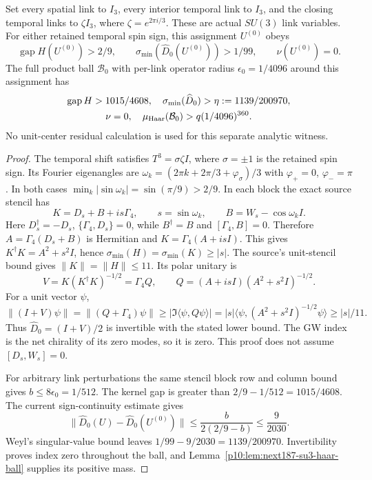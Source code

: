 \documentclass[12pt,a4paper]{article}
\begin{document}
\begin{theorem}
\label{p10:thm:v2189-zero-index-overlap-witness}
Set every spatial link to $I_3$, every interior temporal link to $I_3$,
and the closing temporal links to $\zeta I_3$, where
$\zeta=e^{2\pi i/3}$. These are actual $SU(3)$ link variables.
For either retained temporal spin sign, this assignment $U^{(0)}$ obeys
\[
 \operatorname{gap}H(U^{(0)})>2/9,
 \qquad \sigma_{\min}(\widehat D_0(U^{(0)}))>1/99,
 \qquad \nu(U^{(0)})=0.
\]
The full product ball $\mathcal B_0$ with per-link operator radius
$\epsilon_0=1/4096$ around this assignment has
\[
 \begin{gathered}
 \operatorname{gap}H>1015/4608,\quad
 \sigma_{\min}(\widehat D_0)>\eta:=1139/200970,\\
 \nu=0,\quad\mu_{\rm Haar}(\mathcal B_0)>q(1/4096)^{360}.
 \end{gathered}
\]
No unit-center residual calculation is used for this separate analytic witness.
\end{theorem}
\begin{proof}
The temporal shift satisfies $T^3=\sigma\zeta I$, where $\sigma=\pm1$
is the retained spin sign. Its Fourier eigenangles are
$\omega_k=(2\pi k+2\pi/3+\varphi_\sigma)/3$ with
$\varphi_+=0$, $\varphi_-=\pi$. In both cases
$\min_k|\sin\omega_k|=\sin(\pi/9)>2/9$.
In each block the exact source stencil has
\[
 K=D_s+B+i s\Gamma_4,\qquad
 s=\sin\omega_k,\qquad B=W_s-\cos\omega_k I.
\]
Here $D_s^\dagger=-D_s$, $\{\Gamma_4,D_s\}=0$, while
$B^\dagger=B$ and $[\Gamma_4,B]=0$. Therefore
$A=\Gamma_4(D_s+B)$ is Hermitian and
$K=\Gamma_4(A+i sI)$. This gives
$K^\dagger K=A^2+s^2I$, hence
$\sigma_{\min}(H)=\sigma_{\min}(K)\ge|s|$.
The source's unit-stencil bound gives $\|K\|=\|H\|\le11$.
Its polar unitary is
\[
 V=K(K^\dagger K)^{-1/2}
   =\Gamma_4Q,\qquad
 Q=(A+i sI)(A^2+s^2I)^{-1/2}.
\]
For a unit vector $\psi$,
\[
 \|(I+V)\psi\|=\|(Q+\Gamma_4)\psi\|
 \ge\left|\Im\langle\psi,Q\psi\rangle\right|
 =|s|\langle\psi,(A^2+s^2I)^{-1/2}\psi\rangle
 \ge|s|/11.
\]
Thus $\widehat D_0=(I+V)/2$ is invertible with the stated lower bound.
The GW index is the net chirality of its zero modes, so it is zero.
This proof does not assume $[D_s,W_s]=0$.

For arbitrary link perturbations the same stencil block row and column
bound gives $b\le8\epsilon_0=1/512$. The kernel gap is greater than
$2/9-1/512=1015/4608$. The current sign-continuity estimate gives
\[
 \|\widehat D_0(U)-\widehat D_0(U^{(0)})\|
 \le\frac{b}{2(2/9-b)}\le\frac9{2030}.
\]
Weyl's singular-value bound leaves
$1/99-9/2030=1139/200970$. Invertibility proves index zero throughout
the ball, and Lemma~\ref{p10:lem:next187-su3-haar-ball} supplies its positive mass.
\end{proof}
\end{document}
